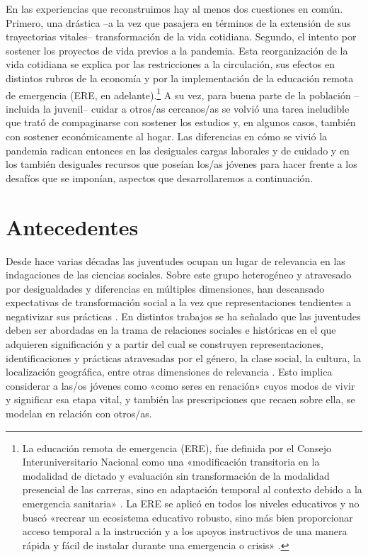 \begin{refsection}
En las experiencias que reconstruimos hay al menos dos cuestiones en común. Primero, una drástica –a la vez que pasajera en términos de la extensión de sus trayectorias vitales– transformación de la vida cotidiana. Segundo, el intento por sostener los proyectos de vida previos a la pandemia. Esta reorganización de la vida cotidiana se explica por las restricciones a la circulación, sus efectos en distintos rubros de la economía y por la implementación de la educación remota de emergencia (ERE, en adelante).\footnote{La educación remota de emergencia (ERE), fue definida por el Consejo
      Interuniversitario Nacional como una «modificación transitoria
      en la modalidad de dictado y evaluación sin transformación de la
      modalidad presencial de las carreras, sino en adaptación temporal al
      contexto debido a la emergencia sanitaria»
      \protect\parencite[pág.~47]{4239-MARTIN2023}.
      La ERE se aplicó en todos los niveles educativos y no buscó
      «recrear un ecosistema educativo robusto, sino más bien
      proporcionar acceso temporal a la instrucción y a los apoyos
      instructivos de una manera rápida y fácil de instalar durante una
      emergencia o crisis»
      \protect\parencites[pág.~17]{4243-HODGES2020}[en][pág.~199]{4250-MACCHIAROLA2021}.} A su vez, para buena parte de la población –incluida la juvenil– cuidar a otros/as cercanos/as se volvió una tarea ineludible que trató de compaginarse con sostener los estudios y, en algunos casos, también con sostener económicamente al hogar. Las diferencias en cómo se vivió la pandemia radican entonces en las desiguales cargas laborales y de cuidado y en los también desiguales recursos que poseían los/as jóvenes para hacer frente a los desafíos que se imponían, aspectos que desarrollaremos a continuación.


\section[Antecedentes]{Antecedentes}
\label{cap-27.antecedentes}
Desde hace varias décadas las juventudes ocupan un lugar de relevancia en las indagaciones de las ciencias sociales. Sobre este grupo heterogéneo y atravesado por desigualdades y diferencias en múltiples dimensiones, han descansado expectativas de transformación social a la vez que representaciones tendientes a negativizar sus prácticas \protect\parencite{4247-CHAVES2005}. En distintos trabajos se ha señalado que las juventudes deben ser abordadas en la trama de relaciones sociales e históricas en el que adquieren significación y a partir del cual se construyen representaciones, identificaciones y prácticas atravesadas por el género, la clase social, la cultura, la localización geográfica, entre otras dimensiones de relevancia \protect\parencites{4195-MARGULIS2001}[entre otros]{4227-REGUILLO2000}. Esto implica considerar a las/os jóvenes como «como seres en renación» \protect\parencite[pág.~37]{4248-CHAVES2010} cuyos modos de vivir y significar esa etapa vital, y también las prescripciones que recaen sobre ella, se modelan en relación con otros/as.


\end{refsection}
